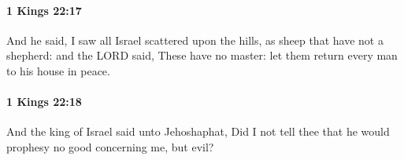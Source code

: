 		\paragraph{1 Kings 22:17} %
			\label{1KINGS-22-17}

			And he said, I saw all Israel scattered upon the hills, as sheep that have not a shepherd: and the LORD said, These have no master: let them return every man to his house in peace.


		\paragraph{1 Kings 22:18} %
			\label{1KINGS-22-18}

			And the king of Israel said unto Jehoshaphat, Did I not tell thee that he would prophesy no good concerning me, but evil?


